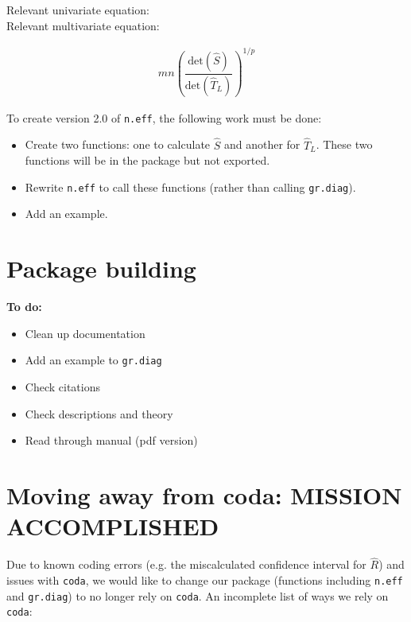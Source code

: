 \documentclass[12pt]{article}
\theoremstyle{remark}
\begin{document}
Relevant univariate equation: \\

Relevant multivariate equation:

\begin{align*}
m n \left( \dfrac{\text{det}(\hat{S})}{\text{det}(\hat{T}_L)} \right)^{1/p}
\end{align*}

To create version 2.0 of \texttt{n.eff}, the following work must be done:

\begin{itemize}
 \renewcommand{\labelitemi}{$\square$}
\item Create two functions: one to calculate $\hat{S}$ and another for $\hat{T}_L$. These two functions will be in the package but not exported. 
\item Rewrite \texttt{n.eff} to call these functions (rather than calling \texttt{gr.diag}).

\item Add an example.

\end{itemize}





\section{\textbf{Package building}}
\textbf{To do:}
\begin{itemize}
 \renewcommand{\labelitemi}{$\square$}
\item Clean up documentation
\item Add an example to \texttt{gr.diag} 
\item Check citations
\item Check descriptions and theory
\item Read through manual (pdf version)
\end{itemize}



\section{\textbf{Moving away from coda: MISSION ACCOMPLISHED}}

Due to known coding errors (e.g. the miscalculated confidence interval for $\hat{R}$) and issues with \texttt{coda}, we would like to change our package (functions including \texttt{n.eff} and \texttt{gr.diag}) to no longer rely on \texttt{coda}. An incomplete list of ways we rely on  \texttt{coda}: 
\end{document}
